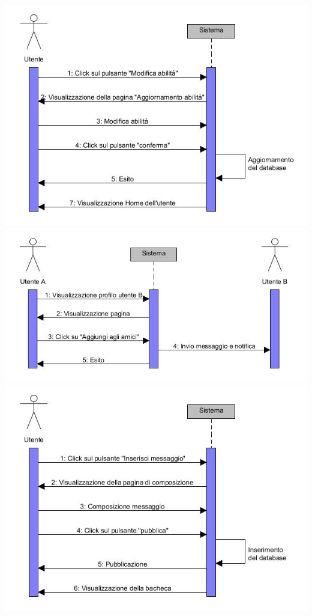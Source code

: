 \documentclass[a4paper,12pt]{article}
\begin{document}
\begin{center}
\vspace*{\fill}
\includegraphics[scale=0.75]{sDiagrams/modificaAbilita.jpg} \\
\clearpage
\includegraphics[scale=0.75]{sDiagrams/richiestaAmicizia.jpg} \\
\vspace*{\fill}
\includegraphics[scale=0.75]{sDiagrams/creazioneThread.jpg} \\

\end{center}
\end{document}
